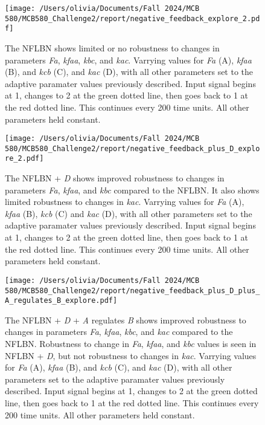 \documentclass{article}
\begin{document}
\begin{figure}[H]
    \centering
    \texttt{[image: /Users/olivia/Documents/Fall 2024/MCB 580/MCB580\_Challenge2/report/negative\_feedback\_explore\_2.pdf]}
    \caption{The NFLBN shows limited or no robustness to changes in parameters \textit{Fa}, \textit{kfaa}, \textit{kbc}, and \textit{kac}. Varrying values for \textit{Fa} (A), \textit{kfaa} (B), and \textit{kcb} (C), and \textit{kac} (D), with all other parameters set to the adaptive paramater values previously described. Input signal begins at 1, changes to 2 at the green dotted line, then goes back to 1 at the red dotted line. This continues every 200 time units. All other parameters held constant.}
    \label{fig:9}
\end{figure}

\begin{figure}[H]
    \centering
    \texttt{[image: /Users/olivia/Documents/Fall 2024/MCB 580/MCB580\_Challenge2/report/negative\_feedback\_plus\_D\_explore\_2.pdf]}
    \caption{The NFLBN + \textit{D} shows improved robustness to changes in parameters \textit{Fa}, \textit{kfaa}, and \textit{kbc} compared to the NFLBN. It also shows limited robustness to changes in \textit{kac}. Varrying values for \textit{Fa} (A), \textit{kfaa} (B), \textit{kcb} (C) and \textit{kac} (D), with all other parameters set to the adaptive paramater values previously described. Input signal begins at 1, changes to 2 at the green dotted line, then goes back to 1 at the red dotted line. This continues every 200 time units. All other parameters held constant.}
    \label{fig:10}
\end{figure}

\begin{figure}[H]
    \centering
    \texttt{[image: /Users/olivia/Documents/Fall 2024/MCB 580/MCB580\_Challenge2/report/negative\_feedback\_plus\_D\_plus\_A\_regulates\_B\_explore.pdf]}
    \caption{The NFLBN + \textit{D} + \textit{A} regulates \textit{B} shows improved robustness to changes in parameters \textit{Fa}, \textit{kfaa}, \textit{kbc}, and \textit{kac} compared to the NFLBN. Robustness to change in \textit{Fa}, \textit{kfaa}, and \textit{kbc} values is seen in NFLBN + \textit{D}, but not robustness to changes in \textit{kac}. Varrying values for \textit{Fa} (A), \textit{kfaa} (B), and \textit{kcb} (C), and \textit{kac} (D), with all other parameters set to the adaptive paramater values previously described. Input signal begins at 1, changes to 2 at the green dotted line, then goes back to 1 at the red dotted line. This continues every 200 time units. All other parameters held constant.}
    \label{fig:11}
\end{figure}
\end{document}
